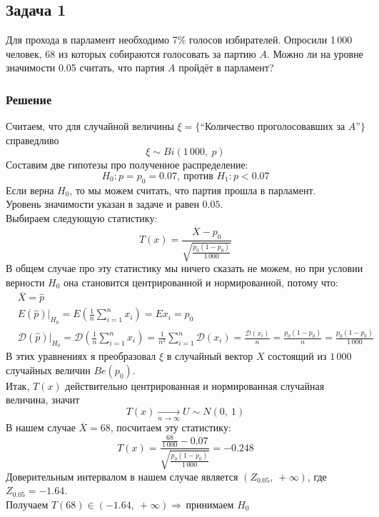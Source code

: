 \documentclass[12pt, a4paper]{article}
\newcommand{\dev}{\mathcal{D}}
\begin{document}
\subsection*{Задача 1}
Для прохода в парламент необходимо 7\% голосов избирателей. Опросили 1\,000 человек, 68 из которых собираются голосовать за партию $A$. Можно ли на уровне значимости 0.05 считать, что партия $A$ пройдёт в парламент?
\subsubsection*{Решение}
Считаем, что для случайной величины $\xi = \{\text{``Количество проголосовавших за $A$''}\}$ справедливо
\[\xi \sim Bi(1\,000,\ p)\]
Составим две гипотезы про полученное распределение:
\[H_0: p = p_0 = 0.07,\ \text{против } H_1: p < 0.07\]
Если верна $H_0$, то мы можем считать, что партия прошла в парламент.\\
Уровень значимости указан в задаче и равен $0.05$.\\
Выбираем следующую статистику:
\[T(x) = \frac{\overline{X} - p_0}{\sqrt{ \frac{p_0(1 - p_0)}{1\,000} }}\]
В общем случае про эту статистику мы ничего сказать не можем, но при условии верности $H_0$ она становится центрированной и нормированной, потому что:
\begin{equation*}
    \begin{aligned}
         & \overline{X} = \hat{p}                                                                                                                                                                                                          \\
         & E\left( \hat{p} \right)\big|_{H_0} = E\left( \frac{1}{n}\sum_{i = 1}^{n}x_i \right) = Ex_i = p_0                                                                                                                                \\
         & \dev\left( \hat{p} \right)\big|_{H_0} = \dev \left( \frac{1}{n}\sum_{i = 1}^{n}x_i \right) = \frac{1}{n^2}\sum_{i = 1}^{n} \dev\left( x_i \right) = \frac{\dev(x_i)}{n} = \frac{p_0(1 - p_0)}{n} = \frac{p_0( 1 - p_0)}{1\,000}
    \end{aligned}
\end{equation*}
В этих уравнениях я преобразовал $\xi$ в случайный вектор $X$ состоящий из $1\,000$ случайных величин $Be(p_0)$.\\
Итак, $T(x)$ действительно центрированная и нормированная случайная величина, значит
\[T(x) \xrightarrow[n\to\infty]{} U \sim N(0,\ 1)\]
В нашем случае $\overline{X} = 68$, посчитаем эту статистику:
\[T(x) = \frac{\frac{68}{1\,000} - 0.07}{\sqrt{\frac{p_0(1 - p_0)}{1\,000}}} = -0.248\]
Доверительным интервалом в нашем случае является $(Z_{0.05},\ +\infty)$, где $Z_{0.05} = -1.64$.\\
Получаем $T(68) \in (-1.64,\ +\infty)\Rightarrow\,$принимаем $H_0$
\end{document}
